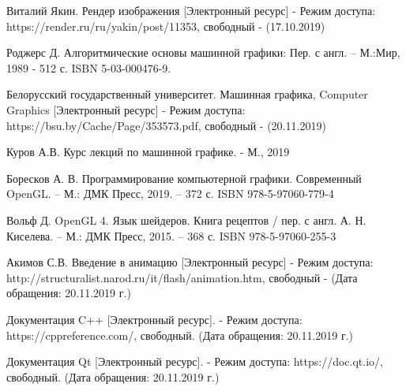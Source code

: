 \begin{thebibliography}{3}
	Виталий Якин. Рендер изображения [Электронный ресурс] - Режим доступа: https://render.ru/ru/yakin/post/11353, свободный - (17.10.2019)
	
	Роджерс Д. Алгоритмические основы машинной графики: Пер. с англ. -- М.:Мир, 1989 - 512 с. ISBN 5-03-000476-9.
	
	Белорусский государственный университет. Машинная графика, Computer Graphics [Электронный ресурс] - Режим доступа: https://bsu.by/Cache/Page/353573.pdf, свободный - (20.11.2019)
	
	Куров А.В. Курс лекций по машинной графике. - М., 2019
	
	Боресков А. В. Программирование компьютерной графики. Современный OpenGL. – М.: ДМК Пресс, 2019. – 372 с. ISBN 978-5-97060-779-4
	
	Вольф Д. OpenGL 4. Язык шейдеров. Книга рецептов / пер. с англ. А. Н. Киселева. – М.: ДМК Пресс, 2015. – 368 с. ISBN 978-5-97060-255-3
	
	Акимов С.В. Введение в анимацию [Электронный ресурс] - Режим доступа: http://structuralist.narod.ru/it/flash/animation.htm, свободный - (Дата обращения: 20.11.2019 г.)
	
	Документация C++ [Электронный ресурс]. - Режим доступа:
	https://cppreference.com/, свободный. (Дата обращения: 20.11.2019 г.)
	
	Документация Qt [Электронный ресурс]. - Режим доступа:
	https://doc.qt.io/, свободный. (Дата обращения: 20.11.2019 г.)
	
	
\end{thebibliography}